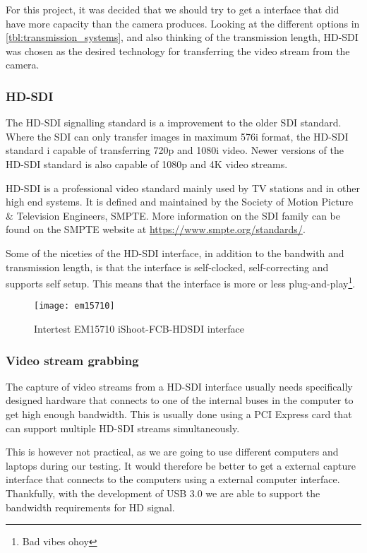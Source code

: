 For this project, it was decided that we should 
try to get a interface that did have more capacity than the camera produces. Looking 
at the different options in \vref{tbl:transmission_systems}, and also thinking of the transmission length, HD-SDI
was chosen as the desired technology for transferring the video stream from the camera.

\subsubsection{HD-SDI}\label{sec:hdsdi}
The HD-SDI signalling standard is a improvement to the older SDI standard. Where the SDI can only transfer images
in maximum 576i format, the HD-SDI standard i capable of transferring 720p and 1080i video. Newer versions 
of the HD-SDI standard is also capable of 1080p and 4K video streams. 

HD-SDI is a professional video standard mainly used by TV stations and in other high end systems. It is 
defined and maintained by the Society of Motion Picture \& Television Engineers, SMPTE. More information 
on the SDI family can be found on the SMPTE website at \url{https://www.smpte.org/standards/}.

Some of the niceties of the HD-SDI interface, in addition to the bandwith and transmission length, is 
that the interface is self-clocked, self-correcting and supports self setup. This means that the 
interface is more or less plug-and-play\footnote{Bad vibes ohoy}. 

\begin{figure}[htbp]
	\centering
	\texttt{[image: em15710]}
	\caption{Intertest EM15710 iShoot-FCB-HDSDI interface}
	\label{fig:em15710}
\end{figure}

\subsubsection{Video stream grabbing}
The capture of video streams from a HD-SDI interface usually needs specifically designed hardware that 
connects to one of the internal buses in the computer to get high enough bandwidth. This is usually 
done using a PCI Express card that can support multiple HD-SDI streams simultaneously. 

This is 
however not practical, as we are going to use different computers and laptops during our testing. 
It would therefore be better to get a external capture interface that connects to the computers using a 
external computer interface. Thankfully, with the development of USB 3.0 we are able 
to support the bandwidth requirements for HD signal.

